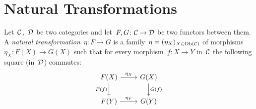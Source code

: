 \section{Natural Transformations}


\begin{definition}
  Let~$\mathcal{C}$,~$\mathcal{D}$ be two categories and let~$F, G \colon \mathcal{C} \to \mathcal{D}$ be two functors between them.
  A \emph{natural transformation}~$\eta \colon F \to G$ is a family~$\eta = (\eta_X)_{X \in \operatorname{Ob}(\mathcal{C})}$ of morphisms~$\eta_X \colon F(X) \to G(X)$ such that for every morphism~$f \colon X \to Y$ in~$\mathcal{C}$ the following square (in~$\mathcal{D}$) commutes:
  \[
    \begin{tikzcd}
        F(X)
        \arrow{r}[above]{\eta_X}
        \arrow{d}[left]{F(f)}
      & G(X)
        \arrow{d}[right]{G(f)}
      \\
        F(Y)
        \arrow{r}[above]{\eta_Y}
      & G(Y)
    \end{tikzcd}
  \]
\end{definition}


